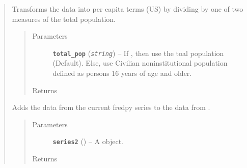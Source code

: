 \documentclass[letterpaper,10pt,english]{sphinxmanual}
\begin{document}
\begin{fulllineitems}
\begin{quote}
\begin{fulllineitems}
\begin{quote}
\begin{description}
\begin{itemize}
\end{itemize}

\item[{Returns}] \leavevmode
{\hyperref[series_class:fredpy.series]{}}

\end{description}\end{quote}

\end{fulllineitems}


\begin{fulllineitems}
\label{series_class:fredpy.series.percapita}
Transforms the data into per capita terms (US) by dividing by one of two measures of the total population.
\begin{quote}\begin{description}
\item[{Parameters}] \leavevmode
\textbf{\texttt{total\_pop}} (\emph{\texttt{string}}) -- If , then use the toal population (Default). Else, use Civilian noninstitutional population defined as persons 16 years of age and older.

\item[{Returns}] \leavevmode
{\hyperref[series_class:fredpy.series]{}}

\end{description}\end{quote}

\end{fulllineitems}


\begin{fulllineitems}
\label{series_class:fredpy.series.plus}
Adds the data from the current fredpy series to the data from .
\begin{quote}\begin{description}
\item[{Parameters}] \leavevmode
\textbf{\texttt{series2}} ({\hyperref[series_class:fredpy.series]{}}) -- A  object.

\item[{Returns}] \leavevmode
{\hyperref[series_class:fredpy.series]{}}


\end{description}
\end{quote}
\end{fulllineitems}
\end{quote}
\end{fulllineitems}
\end{document}
